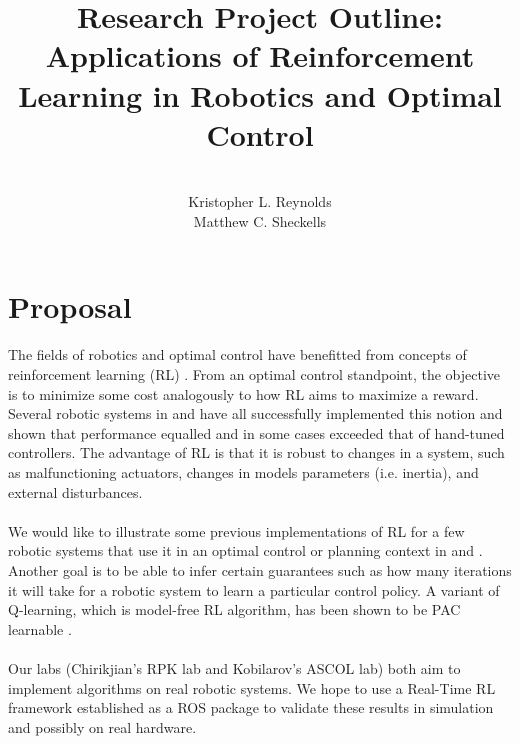 \documentclass[10pt]{article}
\begin{document}
\title{Research Project Outline: Applications of Reinforcement Learning in Robotics and Optimal Control}%
\author{\\ %
Kristopher L. Reynolds\\
Matthew C. Sheckells
\\} %
\maketitle
\section{Proposal}
The fields of robotics and optimal control have benefitted from concepts of reinforcement learning (RL) \cite{kober_reinforcement_2013} \cite{kaelbling_reinforcement_1996}. From an optimal control standpoint, the objective is to minimize some cost analogously to how RL aims to maximize a reward.  Several robotic systems in  \cite{bhasin_reinforcement_2011} and \cite{hester_rtmba:_2012} have all successfully implemented this notion and shown that performance equalled and in some cases exceeded that of hand-tuned controllers. The advantage of RL is that it is robust to changes in a system, such as malfunctioning actuators, changes in models parameters (i.e. inertia), and external disturbances. 
\\
\\
We would like to illustrate some previous implementations of RL for a few robotic systems that use it in an optimal control or planning context in \cite{andersson_model-based_2015} and \cite{ng_autonomous_2006}
. Another goal is to be able to infer certain guarantees such as how many iterations it will take for a robotic system to learn a particular control policy. A variant of Q-learning, which is model-free RL algorithm, has been shown to be PAC learnable \cite{strehl_pac_2006}.  
\\
\\
Our labs (Chirikjian's RPK lab and Kobilarov's ASCOL lab) both aim to implement algorithms on real robotic systems. We hope to use a Real-Time RL framework established as a ROS \cite{quigley_ros:_2009} package to validate these results in simulation and possibly on real hardware. 
\nocite{yang_multiagent_2004}
\nocite{kim_autonomous_2003}

\newpage
{}





\end{document}
